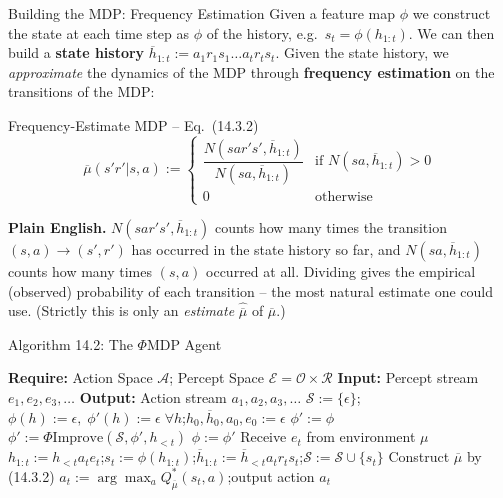 \documentclass[aspectratio=169,10pt]{beamer}
\newcommand{\Sc}{\mathcal{S}}
\newcommand{\Ac}{\mathcal{A}}
\newcommand{\Ec}{\mathcal{E}}
\newcommand{\Oc}{\mathcal{O}}
\newcommand{\Rc}{\mathcal{R}}
\newcommand{\hlt}{h_{<t}}
\begin{document}
\begin{frame}{Building the MDP: Frequency Estimation}
  Given a feature map $\phi$ we construct the state at each time step as
  $\phi$ of the history, e.g.\ $s_t=\phi(h_{1:t})$. We can then build a
  \textbf{state history} $\overline h_{1:t} := a_1r_1s_1\ldots a_tr_ts_t$.
  Given the state history, we \emph{approximate} the dynamics of the MDP
  through \textbf{frequency estimation} on the transitions of the MDP:
  \begin{block}{Frequency-Estimate MDP -- Eq.\ (14.3.2)}
    \[
      \overline\mu(s'r'|s,a) := \begin{cases}
        \dfrac{N(sar's',\overline h_{1:t})}{N(sa,\overline h_{1:t})} & \text{if } N(sa,\overline h_{1:t})>0\\[4pt]
        0 & \text{otherwise}
      \end{cases}
    \]
  \end{block}
  \textbf{Plain English.} $N(sar's',\overline h_{1:t})$ counts how many
  times the transition $(s,a)\to(s',r')$ has occurred in the state history
  so far, and $N(sa,\overline h_{1:t})$ counts how many times $(s,a)$
  occurred at all. Dividing gives the empirical (observed) probability of
  each transition -- the most natural estimate one could use. (Strictly
  this is only an \emph{estimate} $\hat{\overline\mu}$ of $\overline\mu$.)
\end{frame}

\begin{frame}[fragile]{Algorithm 14.2: The $\Phi$MDP Agent}
  \begin{algorithmic}[1]
    \Statex \textbf{Require:} Action Space $\Ac$; Percept Space $\Ec=\Oc\times\Rc$
    \Statex \textbf{Input:} Percept stream $e_1,e_2,e_3,\ldots$
    \Statex \textbf{Output:} Action stream $a_1,a_2,a_3,\ldots$
    \State $\Sc:=\{\epsilon\}$;\quad $\phi(h):=\epsilon,\;\phi'(h):=\epsilon\;\forall h$;\quad $h_0,\overline h_0,a_0,e_0:=\epsilon$
      \State $\phi':=\phi$
        \State $\phi':=\Phi\text{Improve}(\Sc,\phi',\hlt)$
        \If{$\mathit{Cost}(\phi'|\hlt) < \mathit{Cost}(\phi|\hlt)$}
          \State $\phi:=\phi'$
        \EndIf
      \EndWhile
      \State Receive $e_t$ from environment $\mu$
      \State $h_{1:t}:=h_{<t}a_te_t$;\quad $s_t:=\phi(h_{1:t})$;\quad $\overline h_{1:t}:=\overline h_{<t}a_tr_ts_t$;\quad $\Sc:=\Sc\cup\{s_t\}$
      \State Construct $\overline\mu$ by (14.3.2)
      \State $a_t:=\arg\max_a Q^*_{\overline\mu}(s_t,a)$;\quad output action $a_t$
    \EndFor
  \end{algorithmic}
\end{frame}
\end{document}
